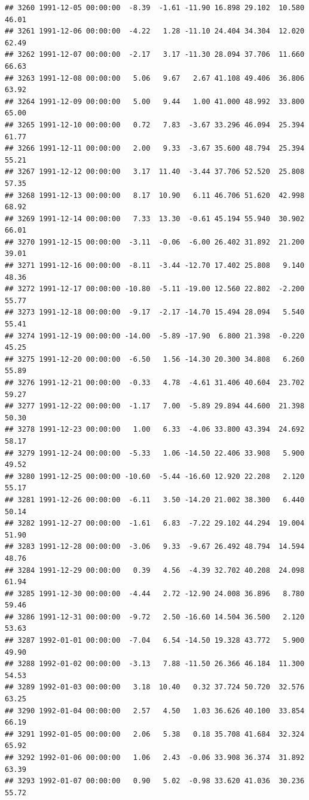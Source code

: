 \documentclass{article}\usepackage{graphicx, color}
\makeatletter
\newenvironment{kframe}{%
 \def\at@end@of@kframe{}%
 \ifinner\ifhmode%
  \def\at@end@of@kframe{\end{minipage}}%
  \begin{minipage}{\columnwidth}%
 \fi\fi%
 \def\FrameCommand##1{\hskip\@totalleftmargin \hskip-\fboxsep
 \colorbox{shadecolor}{##1}\hskip-\fboxsep
     \hskip-\linewidth \hskip-\@totalleftmargin \hskip\columnwidth}%
 \MakeFramed {\advance\hsize-\width
   \@totalleftmargin\z@ \linewidth\hsize
   \@setminipage}}%
 {\par\unskip\endMakeFramed%
 \at@end@of@kframe}
\newenvironment{knitrout}{}{} %
\makeatother
\begin{document}
\begin{knitrout}
\begin{kframe}
\begin{verbatim}
## 3260 1991-12-05 00:00:00  -8.39  -1.61 -11.90 16.898 29.102  10.580  46.01
## 3261 1991-12-06 00:00:00  -4.22   1.28 -11.10 24.404 34.304  12.020  62.49
## 3262 1991-12-07 00:00:00  -2.17   3.17 -11.30 28.094 37.706  11.660  66.63
## 3263 1991-12-08 00:00:00   5.06   9.67   2.67 41.108 49.406  36.806  63.92
## 3264 1991-12-09 00:00:00   5.00   9.44   1.00 41.000 48.992  33.800  65.00
## 3265 1991-12-10 00:00:00   0.72   7.83  -3.67 33.296 46.094  25.394  61.77
## 3266 1991-12-11 00:00:00   2.00   9.33  -3.67 35.600 48.794  25.394  55.21
## 3267 1991-12-12 00:00:00   3.17  11.40  -3.44 37.706 52.520  25.808  57.35
## 3268 1991-12-13 00:00:00   8.17  10.90   6.11 46.706 51.620  42.998  68.92
## 3269 1991-12-14 00:00:00   7.33  13.30  -0.61 45.194 55.940  30.902  66.01
## 3270 1991-12-15 00:00:00  -3.11  -0.06  -6.00 26.402 31.892  21.200  39.01
## 3271 1991-12-16 00:00:00  -8.11  -3.44 -12.70 17.402 25.808   9.140  48.36
## 3272 1991-12-17 00:00:00 -10.80  -5.11 -19.00 12.560 22.802  -2.200  55.77
## 3273 1991-12-18 00:00:00  -9.17  -2.17 -14.70 15.494 28.094   5.540  55.41
## 3274 1991-12-19 00:00:00 -14.00  -5.89 -17.90  6.800 21.398  -0.220  45.25
## 3275 1991-12-20 00:00:00  -6.50   1.56 -14.30 20.300 34.808   6.260  55.89
## 3276 1991-12-21 00:00:00  -0.33   4.78  -4.61 31.406 40.604  23.702  59.27
## 3277 1991-12-22 00:00:00  -1.17   7.00  -5.89 29.894 44.600  21.398  50.30
## 3278 1991-12-23 00:00:00   1.00   6.33  -4.06 33.800 43.394  24.692  58.17
## 3279 1991-12-24 00:00:00  -5.33   1.06 -14.50 22.406 33.908   5.900  49.52
## 3280 1991-12-25 00:00:00 -10.60  -5.44 -16.60 12.920 22.208   2.120  55.17
## 3281 1991-12-26 00:00:00  -6.11   3.50 -14.20 21.002 38.300   6.440  50.14
## 3282 1991-12-27 00:00:00  -1.61   6.83  -7.22 29.102 44.294  19.004  51.90
## 3283 1991-12-28 00:00:00  -3.06   9.33  -9.67 26.492 48.794  14.594  48.76
## 3284 1991-12-29 00:00:00   0.39   4.56  -4.39 32.702 40.208  24.098  61.94
## 3285 1991-12-30 00:00:00  -4.44   2.72 -12.90 24.008 36.896   8.780  59.46
## 3286 1991-12-31 00:00:00  -9.72   2.50 -16.60 14.504 36.500   2.120  53.63
## 3287 1992-01-01 00:00:00  -7.04   6.54 -14.50 19.328 43.772   5.900  49.90
## 3288 1992-01-02 00:00:00  -3.13   7.88 -11.50 26.366 46.184  11.300  54.53
## 3289 1992-01-03 00:00:00   3.18  10.40   0.32 37.724 50.720  32.576  63.25
## 3290 1992-01-04 00:00:00   2.57   4.50   1.03 36.626 40.100  33.854  66.19
## 3291 1992-01-05 00:00:00   2.06   5.38   0.18 35.708 41.684  32.324  65.92
## 3292 1992-01-06 00:00:00   1.06   2.43  -0.06 33.908 36.374  31.892  63.39
## 3293 1992-01-07 00:00:00   0.90   5.02  -0.98 33.620 41.036  30.236  55.72

\end{verbatim}
\end{kframe}
\end{knitrout}
\end{document}
